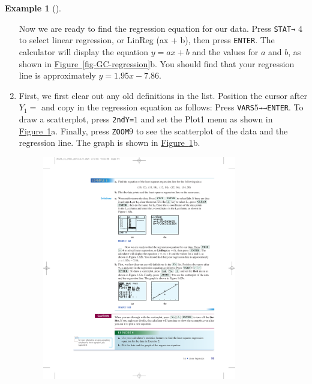 \documentclass[10pt,]{book}
\theoremstyle{plain}
\theoremstyle{definition}
\theoremstyle{definition}
\theoremstyle{definition}
\newtheorem{example}[theorem]{Example}
\theoremstyle{definition}
\theoremstyle{definition}
\numberwithin{equation}{section}
\begin{document}
\begin{example}[]
\begin{enumerate}[label=*\alph**]
        Now we are ready to find the regression equation for our data. Press \lstinline?STAT?\lstinline?→? 4 to select linear regression, or LinReg (ax + b), then press \lstinline?ENTER?. The calculator will display the equation \(y = ax + b\) and the values for \(a\) and \(b\), as shown in \hyperref[fig-GC-regression]{Figure~\ref{fig-GC-regression}}b. You should find that your regression line is approximately \(y = 1.95x − 7.86\).\item\hypertarget{li-215}{}First, we first clear out any old definitions in the list. Position the cursor after \(Y_1 =\) and copy in the regression equation as follows: Press \lstinline?VARS?\(5\)\lstinline?→?\lstinline?→?\lstinline?ENTER?. To draw a scatterplot, press \lstinline?2nd?\lstinline?Y=?\(1\) and set the Plot1 menu as shown in \hyperref[fig-GC-regression2]{Figure~\ref{fig-GC-regression2}}a. Finally, press \lstinline?ZOOM?\(9\) to see the scatterplot of the data and the regression line. The graph is shown in \hyperref[fig-GC-regression2]{Figure~\ref{fig-GC-regression2}}b.
        \leavevmode%
\begin{figure}
\centering
\includegraphics[width=0.80\textwidth,]{images/fig-GC-regression2.pdf}\caption{\label{fig-GC-regression2}}
\end{figure}
\end{enumerate}
\end{example}
\typeout{************************************************}
\typeout{************************************************}
\end{document}

